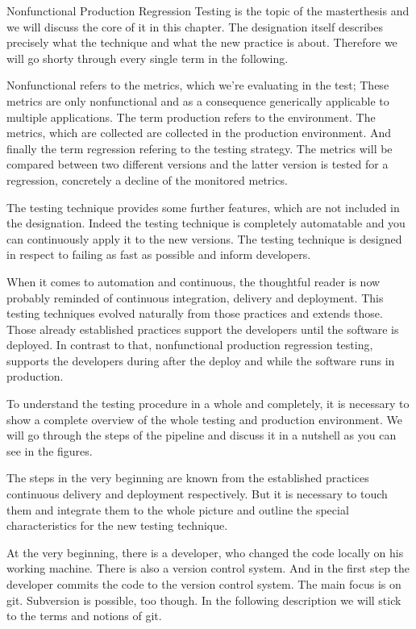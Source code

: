 Nonfunctional Production Regression Testing is the topic of the masterthesis and we will discuss the core of it in this chapter. The designation itself describes precisely what the technique and what the new practice is about. Therefore we will go shorty through every single term in the following.

Nonfunctional refers to the metrics, which we're evaluating in the test; These metrics are only nonfunctional and as a consequence generically applicable to multiple applications. The term production refers to the environment. The metrics, which are collected are collected in the production environment. And finally the term regression refering to the testing strategy. The metrics will be compared between two different versions and the latter version is tested for a regression, concretely a decline of the monitored metrics.

The testing technique provides some further features, which are not included in the designation. Indeed the testing technique is completely automatable and you can continuously apply it to the new versions. The testing technique is designed in respect to failing as fast as possible and inform developers.

When it comes to automation and continuous, the thoughtful reader is now probably reminded of continuous integration, delivery and deployment. This testing techniques evolved naturally from those practices and extends those. Those already established practices support the developers until the software is deployed. In contrast to that, nonfunctional production regression testing, supports the developers during after the deploy and while the software runs in production.

To understand the testing procedure in a whole and completely, it is necessary to show a complete overview of the whole testing and production environment. We will go through the steps of the pipeline and discuss it in a nutshell as you can see in the figures.

The steps in the very beginning are known from the established practices continuous delivery and deployment respectively. But it is necessary to touch them and integrate them to the whole picture and outline the special characteristics for the new testing technique.

At the very beginning, there is a developer, who changed the code locally on his working machine. There is also a version control system. And in the first step the developer commits the code to the version control system. The main focus is on git. Subversion is possible, too though. In the following description we will stick to the terms and notions of git.

